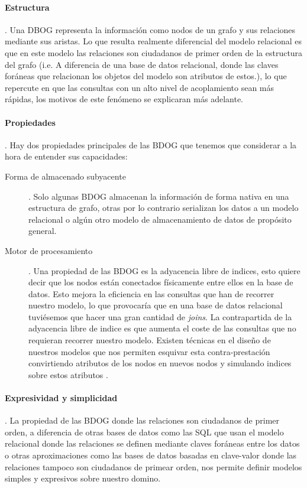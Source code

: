 \paragraph{Estructura}.\newline
Una DBOG representa la información como nodos de un grafo y sus relaciones mediante sus aristas. Lo que resulta realmente diferencial del modelo relacional es que en este modelo las relaciones son ciudadanos de primer orden de la estructura del grafo (i.e. A diferencia de una base de datos relacional, donde las claves foráneas que relacionan los objetos del modelo son atributos de estos.)\cite{graphdbbook}, lo que repercute en que las consultas con un alto nivel de acoplamiento sean más rápidas, los motivos de este fenómeno se explicaran más adelante. 
\paragraph{Propiedades}.\newline
Hay dos propiedades principales de las BDOG que tenemos que considerar a la hora de entender sus capacidades:
\begin{description}
\item[Forma de almacenado subyacente].\newline
Solo algunas BDOG almacenan la información de forma nativa en una estructura de grafo, otras por lo contrario serializan los datos a un modelo relacional o algún otro modelo de almacenamiento de datos de propósito general.
\item[Motor de procesamiento].\newline
Una propiedad de las BDOG es la adyacencia libre de indices, esto quiere decir que los nodos están conectados físicamente entre ellos en la base de datos. Esto mejora la eficiencia en las consultas que han de recorrer nuestro modelo, lo que provocaría que en una base de datos relacional tuviésemos que hacer una gran cantidad de \textit{joins}. La contrapartida de la adyacencia libre de indice es que aumenta el coste de las consultas que no requieran recorrer nuestro modelo. Existen técnicas en el diseño de nuestros  modelos que nos permiten esquivar esta contra-prestación convirtiendo atributos de los nodos en nuevos nodos y simulando indices sobre estos atributos \cite{rodriguez2010graph}.
\end{description}

\paragraph{Expresividad y simplicidad}.\newline
La propiedad de las BDOG donde las relaciones son ciudadanos de primer orden, a diferencia de otras bases de datos como las SQL que usan el modelo relacional donde las relaciones se definen mediante claves foráneas entre los datos o otras aproximaciones como las bases de datos basadas en clave-valor donde las relaciones tampoco son ciudadanos de primear orden, nos permite definir modelos simples y expresivos sobre nuestro domino.\newline


